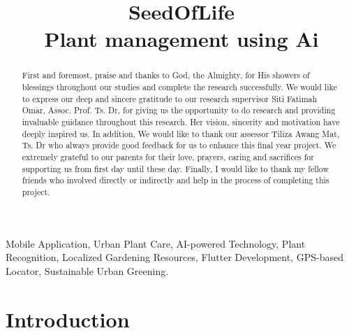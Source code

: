 \documentclass[conference]{IEEEtran}
\begin{document}
\title{SeedOfLife\\ \large
Plant management using Ai}

\author{
\and
{}

}

\maketitle

\begin{abstract}
First and foremost, praise and thanks to God, the Almighty, for His showers of blessings throughout our studies and complete the research successfully. We would like to express our deep and sincere gratitude to our research supervisor Siti Fatimah Omar, Assoc. Prof. Ts. Dr, for giving us the opportunity to do research and providing invaluable guidance throughout this research. Her vision, sincerity and motivation have deeply inspired us. In addition, We would like to thank our assessor Tiliza Awang Mat, Ts. Dr who always provide good feedback for us to enhance this final year project. We extremely grateful to our parents for their love, prayers, caring and sacrifices for supporting us from first day until these day. Finally, I would like to thank my fellow friends who involved directly or indirectly and help in the process of completing this project.
\end{abstract}

\begin{IEEEkeywords}
Mobile Application, Urban Plant Care, AI-powered Technology, Plant Recognition, Localized Gardening Resources, Flutter Development, GPS-based Locator, Sustainable Urban Greening.
\end{IEEEkeywords}

\thispagestyle{firstpagefooter}

\section{Introduction}
\label{sec:introduction}
\end{document}
